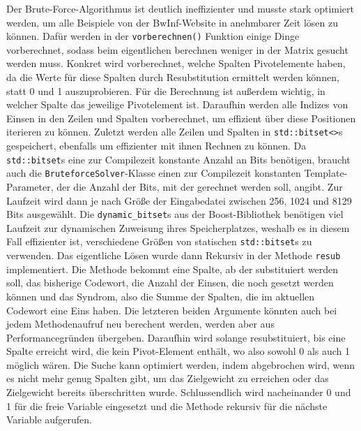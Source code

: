 \documentclass[a4paper,10pt,ngerman]{scrartcl}
\begin{document}
Der Brute-Force-Algorithmus ist deutlich ineffizienter und musste stark optimiert werden, um alle Beispiele von der BwInf-Website in anehmbarer Zeit lösen zu können. 
Dafür werden in der \lstinline{vorberechnen()} Funktion einige Dinge vorberechnet, sodass beim eigentlichen berechnen weniger in der Matrix gesucht werden muss. 
Konkret wird vorberechnet, welche Spalten Pivotelemente haben, da die Werte für diese Spalten durch Resubstitution ermittelt werden können, statt 0 und 1 auszuprobieren. 
Für die Berechnung ist außerdem wichtig, in welcher Spalte das jeweilige Pivotelement ist. 
Daraufhin werden alle Indizes von Einsen in den Zeilen und Spalten vorberechnet, um effizient über diese Positionen iterieren zu können. 
Zuletzt werden alle Zeilen und Spalten in \lstinline{std::bitset<>}s gespeichert, ebenfalls um effizienter mit ihnen Rechnen zu können.
Da \lstinline{std::bitset}s eine zur Compilezeit konstante Anzahl an Bits benötigen, braucht auch die \lstinline{BruteforceSolver}-Klasse einen zur Compilezeit konstanten Template-Parameter, der die Anzahl der Bits, mit der gerechnet werden soll, angibt.  
Zur Laufzeit wird dann je nach Größe der Eingabedatei zwischen 256, 1024 und 8129 Bits ausgewählt. 
Die \lstinline{dynamic_bitset}s aus der Boost-Bibliothek benötigen viel Laufzeit zur dynamischen Zuweisung ihres Speicherplatzes, weshalb es in diesem Fall effizienter ist, verschiedene Größen von statischen \lstinline{std::bitset}s zu verwenden.
Das eigentliche Lösen wurde dann Rekursiv in der Methode \lstinline{resub} implementiert.
Die Methode bekommt eine Spalte, ab der substituiert werden soll, das bisherige Codewort, die Anzahl der Einsen, die noch gesetzt werden können und das Syndrom, also die Summe der Spalten, die im aktuellen Codewort eine Eins haben. 
Die letzteren beiden Argumente könnten auch bei jedem Methodenaufruf neu berechent werden, werden aber aus Performancegründen übergeben. 
Daraufhin wird solange resubstituiert, bis eine Spalte erreicht wird, die kein Pivot-Element enthält, wo also sowohl 0 als auch 1 möglich wären.
Die Suche kann optimiert werden, indem abgebrochen wird, wenn es nicht mehr genug Spalten gibt, um das Zielgewicht zu erreichen oder das Zielgewicht bereits überschritten wurde. 
Schlussendlich wird nacheinander 0 und 1 für die freie Variable eingesetzt und die Methode rekursiv für die nächste Variable aufgerufen. 
\end{document}
